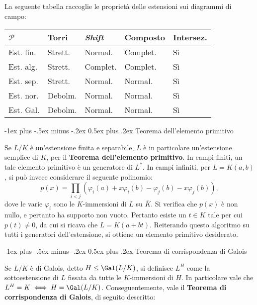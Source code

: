 \documentclass[10pt,landscape]{article}
\makeatletter
\renewcommand{\section}{\@startsection{section}{1}{0mm}%
	{-1ex plus -.5ex minus -.2ex}%
	{0.5ex plus .2ex}%
	{\normalfont\large\bfseries}}
\makeatother
\begin{document}
\begin{multicols}{3}
		La seguente tabella raccoglie le proprietà
		delle estensioni sui diagrammi di campo:
		\begin{center}
			\scriptsize
			\vskip -0.1in
			\begin{tabular}{l|l|l|l|l}
				\hline
				$\mathcal{P}$ & Torri        & \textit{Shift} & Composto      & Intersez. \\ \hline
				Est. fin.            & Strett. & Normal.                     & Complet. & Sì           \\ \hline
				Est. alg.         & Strett. & Complet.                   & Complet. & Sì           \\ \hline
				Est. sep.        & Strett. & Normal.                     & Normal.   & Sì           \\ \hline
				Est. nor.           & Debolm.   & Normal.                     & Normal.   & Sì           \\ \hline
				Est. Gal.        & Debolm.   & Normal.                     & Normal.   & Sì          
			\end{tabular}
		\end{center}


		\section{Teorema dell'elemento primitivo}
		
		Se $L / K$ è un'estensione finita e separabile,
		$L$ è in particolare un'estensione semplice di
		$K$, per il \textbf{Teorema dell'elemento primitivo}.
		In campi finiti, un tale elemento primitivo è
		un generatore di $L^*$. In campi infiniti, per
		$L = K(a, b)$,
		si può invece considerare il seguente polinomio:
		\[ p(x) = \prod_{i < j} (\varphi_i(a) + x \varphi_i(b) - \varphi_j(b) - x \varphi_j(b)), \]
		dove le varie $\varphi_i$ sono le $K$-immersioni di
		$L$ su $\overline{K}$.
		Si verifica che $p(x)$ è non nullo, e pertanto
		ha supporto non vuoto. Pertanto esiste un $t \in K$ tale
		per cui $p(t) \neq 0$, da cui si ricava che
		$L = K(a + bt)$. Reiterando questo algoritmo su
		tutti i generatori dell'estensione, si ottiene
		un elemento primitivo desiderato.
		
		\section{Teorema di corrispondenza di Galois}
		
		
		Se $L / K$ è di Galois, detto $H \leq \Gal(L / K)$,
		si definisce $L^H$ come la sottoestensione di $L$
		fissata da tutte le $K$-immersioni di $H$.
		In particolare vale che $L^H = K \iff H = \Gal(L / K)$.
		Conseguentemente, vale il \textbf{Teorema di corrispondenza di Galois}, di seguito descritto:
		

\end{multicols}
\end{document}
